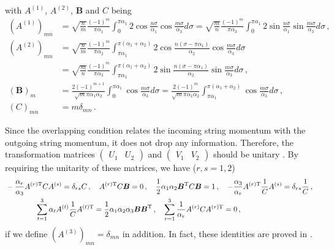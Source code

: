\documentclass[12pt]{article}
\begin{document}
with $A^{(1)}$, $A^{(2)}$, $\boldsymbol{B}$ and $C$ being
\begin{align}
(A^{(1)})_{mn}&=\sqrt{\frac{n}{m}}\frac{(-1)^m}{\pi\alpha_1}
\int_0^{\pi\alpha_1}\!
2\cos\frac{n\sigma}{\alpha_1}\cos\frac{m\sigma}{\alpha_3}d\sigma
=\sqrt{\frac{m}{n}}\frac{(-1)^m}{\pi\alpha_3}
\int_0^{\pi\alpha_1}\!
2\sin\frac{n\sigma}{\alpha_1}\sin\frac{m\sigma}{\alpha_3}d\sigma\,,\\
(A^{(2)})_{mn}&=\sqrt{\frac{n}{m}}\frac{(-1)^m}{\pi\alpha_2}
\int_{\pi\alpha_1}^{\pi(\alpha_1+\alpha_2)}\!
2\cos\frac{n(\sigma-\pi\alpha_1)}{\alpha_2}
\cos\frac{m\sigma}{\alpha_3}d\sigma\nonumber\\
&=\sqrt{\frac{m}{n}}\frac{(-1)^m}{\pi\alpha_3}
\int_{\pi\alpha_1}^{\pi(\alpha_1+\alpha_2)}\!
2\sin\frac{n(\sigma-\pi\alpha_1)}{\alpha_2}
\sin\frac{m\sigma}{\alpha_3}d\sigma\,,\\
(\boldsymbol{B})_m&=\frac{2(-1)^{m+1}}{\sqrt{m}\pi\alpha_1\alpha_2}
\int_0^{\pi\alpha_1}\!\cos\frac{m\sigma}{\alpha_3}d\sigma
=\frac{2(-1)^{m}}{\sqrt{m}\pi\alpha_1\alpha_2}
\int_{\pi\alpha_1}^{\pi(\alpha_1+\alpha_2)}\!
\cos\frac{m\sigma}{\alpha_3}d\sigma\,,\\
(C)_{mn}&=m\delta_{mn}\,.
\end{align}

Since the overlapping condition relates the incoming string momentum
with the outgoing string momentum, it does not drop any information.
Therefore, the transformation matrices
$\begin{pmatrix}U_1&U_2\end{pmatrix}$ and
$\begin{pmatrix}V_1&V_2\end{pmatrix}$ should be unitary \cite{GMP3}.
By requiring the unitarity of these matrices, we have ($r,s=1,2$)
\begin{align}
&-\frac{\alpha_r}{\alpha_3}
A^{(r){\rm T}}CA^{(s)}
=\delta_{rs}C\,,\quad
A^{(r){\rm T}}C\boldsymbol{B}=0\,,\quad
\frac{1}{2}\alpha_1\alpha_2
\boldsymbol{B}^{{\rm T}}C\boldsymbol{B}=1\,,\quad
-\frac{\alpha_3}{\alpha_r}
A^{(r){\rm T}}\frac{1}{C}A^{(s)}=\delta_{rs}\frac{1}{C}\,,
\nonumber\\
&\qquad\qquad\sum_{t=1}^3\alpha_tA^{(t)}\frac{1}{C}A^{(t){\rm T}}
=\frac{1}{2}\alpha_1\alpha_2\alpha_3
\boldsymbol{B}\boldsymbol{B}^{{\rm T}}\,,\quad
\sum_{r=1}^3\frac{1}{\alpha_r}A^{(r)}CA^{(r){\rm T}}=0\,,
\end{align}
if we define $(A^{(3)})_{mn}=\delta_{mn}$ in addition.
In fact, these identities are proved in \cite{GS}.
\end{document}
